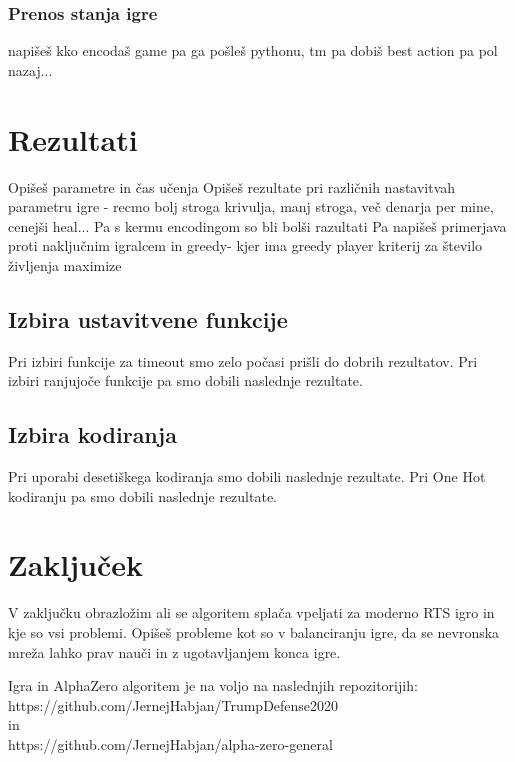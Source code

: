 \documentclass[a4paper, 12pt]{book}
\begin{document}
\subsection{Prenos stanja igre}
napišeš kko encodaš game pa ga pošleš pythonu, tm pa dobiš best action pa pol nazaj...


\chapter{Rezultati}
\label{chrezultati}
Opišeš parametre in čas učenja
Opišeš rezultate pri različnih nastavitvah parametru igre - recmo bolj stroga krivulja, manj stroga, več denarja per mine, cenejši heal...
Pa s kermu encodingom so bli bolši razultati
Pa napišeš primerjava proti naključnim igralcem in greedy- kjer ima greedy player kriterij za število življenja maximize
\section{Izbira ustavitvene funkcije}
Pri izbiri funkcije za timeout smo zelo počasi prišli do dobrih rezultatov.
Pri izbiri ranjujoče funkcije pa smo dobili naslednje rezultate.

\section{Izbira kodiranja}
Pri uporabi desetiškega kodiranja smo dobili naslednje rezultate.
Pri One Hot kodiranju pa smo dobili naslednje rezultate.


\chapter{Zaključek}
\label{chzakljucek}
V zaključku obrazložim ali se algoritem splača vpeljati za moderno RTS igro in kje so vsi problemi.
Opišeš probleme kot so v balanciranju igre, da se nevronska mreža lahko prav nauči in z ugotavljanjem konca igre.

Igra in AlphaZero algoritem je na voljo na naslednjih repozitorijih:\\
https://github.com/JernejHabjan/TrumpDefense2020\\
in \\ 
https://github.com/JernejHabjan/alpha-zero-general


\newpage %
\ \\
\clearpage
{}


\end{document}
